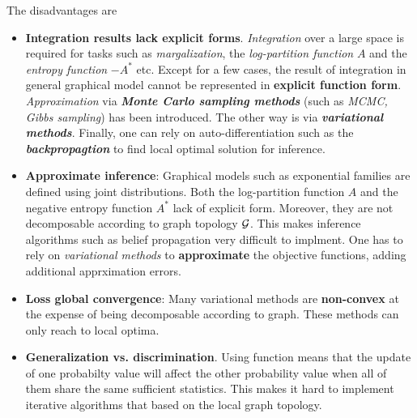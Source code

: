 \documentclass[11pt]{article}
\begin{document}
The disadvantages are
\begin{itemize}
\item \textbf{Integration results lack explicit forms}. \emph{Integration} over a large space is required for tasks such as  \emph{margalization}, the \emph{log-partition function} $A$ and the \emph{entropy function} $-A^{*}$ etc. Except for a few cases, the result of integration in general graphical model cannot be represented in \textbf{explicit function form}.  \emph{Approximation} via \textbf{\emph{Monte Carlo sampling methods}} (such as \emph{MCMC, Gibbs sampling}) \citep{shapiro2003monte} has been introduced. The other way is via \textbf{\emph{variational methods}}. Finally, one can rely on auto-differentiation such as the \emph{\textbf{backpropagtion}} to find local optimal solution for inference.

\item \textbf{Approximate inference}: Graphical models such as exponential families are defined using joint distributions. Both the log-partition function $A$ and the negative entropy function $A^{*}$ lack of explicit form. Moreover, they are not decomposable according to graph topology ${\mathcal G}$.  This makes inference algorithms such as belief propagation very difficult to implment. One has to rely on \emph{variational methods} to \textbf{approximate} the objective functions, adding additional apprximation errors. 

\item \textbf{Loss global convergence}: Many variational methods are \textbf{non-convex} at the expense of being decomposable according to graph. These methods can only reach to local optima.

\item \textbf{Generalization vs. discrimination}. Using function means that the update of one probabilty value will affect the other probability value when all of them share the same sufficient statistics. This makes it hard to implement iterative algorithms that based on the local graph topology.
\end{itemize}


\newpage
\end{document}
